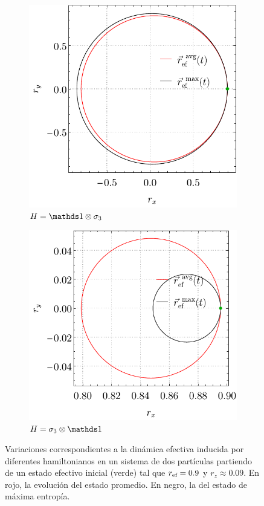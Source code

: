 \begin{figure}[ht!]
    \centering
    \begin{subfigure}{0.5\textwidth}
      \centering
      \includegraphics[width=0.8\linewidth]{chapter5/figures/local_AvgVSMax_p2=0.1_r=0.9_w1=0_w2=1.pdf}
      \caption{$H=\Id\otimes\pauli{3}$}
    \end{subfigure}%
    \begin{subfigure}{0.5\textwidth}
      \centering
      \includegraphics[width=0.8\linewidth]{chapter5/figures/local_AvgVSMax_p2=0.1_r=0.9_w1=1_w2=0.pdf}
      \caption{$H=\pauli{3}\otimes\Id$}
    \end{subfigure}
    \caption{Variaciones correspondientes a la dinámica efectiva inducida por diferentes hamiltonianos en un sistema de dos partículas partiendo de un estado efectivo inicial (verde) tal que $r_{\text{ef}}=0.9$ y $r_{z}\approx0.09$. En rojo, la evolución del estado promedio. En negro, la del estado de máxima entropía. \label{ap:EffDunAVGvsMaxEnt1}}
\end{figure}

